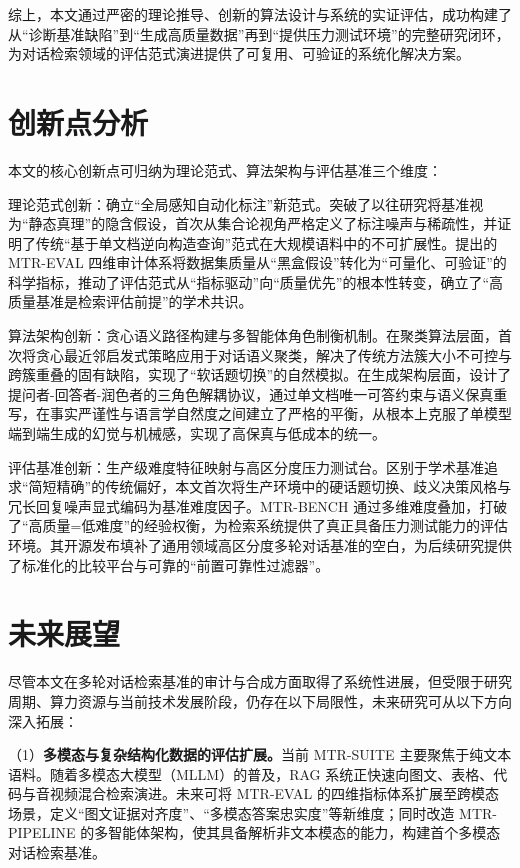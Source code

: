 综上，本文通过严密的理论推导、创新的算法设计与系统的实证评估，成功构建了从“诊断基准缺陷”到“生成高质量数据”再到“提供压力测试环境”的完整研究闭环，为对话检索领域的评估范式演进提供了可复用、可验证的系统化解决方案。

\section{创新点分析}
\label{sec:contributions}

本文的核心创新点可归纳为理论范式、算法架构与评估基准三个维度：

理论范式创新：确立“全局感知自动化标注”新范式。突破了以往研究将基准视为“静态真理”的隐含假设，首次从集合论视角严格定义了标注噪声与稀疏性，并证明了传统“基于单文档逆向构造查询”范式在大规模语料中的不可扩展性。提出的 MTR-EVAL 四维审计体系将数据集质量从“黑盒假设”转化为“可量化、可验证”的科学指标，推动了评估范式从“指标驱动”向“质量优先”的根本性转变，确立了“高质量基准是检索评估前提”的学术共识。

算法架构创新：贪心语义路径构建与多智能体角色制衡机制。在聚类算法层面，首次将贪心最近邻启发式策略应用于对话语义聚类，解决了传统方法簇大小不可控与跨簇重叠的固有缺陷，实现了“软话题切换”的自然模拟。在生成架构层面，设计了提问者-回答者-润色者的三角色解耦协议，通过单文档唯一可答约束与语义保真重写，在事实严谨性与语言学自然度之间建立了严格的平衡，从根本上克服了单模型端到端生成的幻觉与机械感，实现了高保真与低成本的统一。

评估基准创新：生产级难度特征映射与高区分度压力测试台。区别于学术基准追求“简短精确”的传统偏好，本文首次将生产环境中的硬话题切换、歧义决策风格与冗长回复噪声显式编码为基准难度因子。MTR-BENCH 通过多维难度叠加，打破了“高质量=低难度”的经验权衡，为检索系统提供了真正具备压力测试能力的评估环境。其开源发布填补了通用领域高区分度多轮对话基准的空白，为后续研究提供了标准化的比较平台与可靠的“前置可靠性过滤器”。

\section{未来展望}
\label{sec:future_work}

尽管本文在多轮对话检索基准的审计与合成方面取得了系统性进展，但受限于研究周期、算力资源与当前技术发展阶段，仍存在以下局限性，未来研究可从以下方向深入拓展：

（1）\textbf{多模态与复杂结构化数据的评估扩展。}当前 MTR-SUITE 主要聚焦于纯文本语料。随着多模态大模型（MLLM）的普及，RAG 系统正快速向图文、表格、代码与音视频混合检索演进。未来可将 MTR-EVAL 的四维指标体系扩展至跨模态场景，定义“图文证据对齐度”、“多模态答案忠实度”等新维度；同时改造 MTR-PIPELINE 的多智能体架构，使其具备解析非文本模态的能力，构建首个多模态对话检索基准。
    
